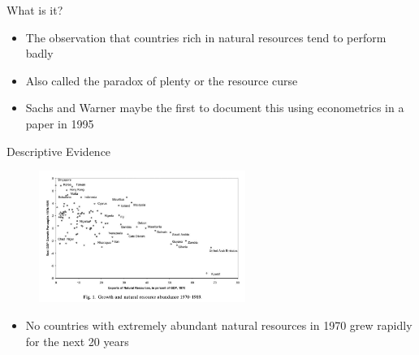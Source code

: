 \documentclass[11pt,notes=hide,aspectratio=169,mathserif]{beamer}
\begin{document}
\begin{frame}{What is it?}

\begin{itemize}
\item The observation that countries rich in natural resources tend to perform badly
\item Also called the paradox of plenty or the resource curse
\item Sachs and Warner maybe the first to document this using econometrics in a paper in 1995
\end{itemize}
\end{frame}

\begin{frame}{Descriptive Evidence}
\begin{figure}
\centering
\includegraphics[width=0.6\textwidth]{../TA9/inputs/fig1.png}
\end{figure}
\begin{itemize}
\item No countries with extremely abundant natural resources in 1970 grew rapidly for the next 20 years
\end{itemize}
\end{frame}
\end{document}
